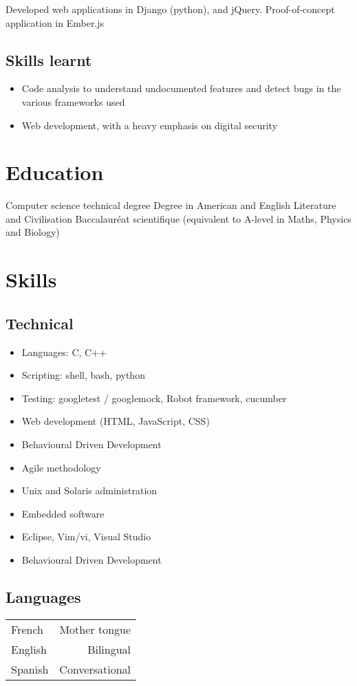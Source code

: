 \documentclass{cv}
\begin{document}
{Developed web applications in Django (python), and jQuery. Proof-of-concept application in Ember.js}
\subsection{Skills learnt}
\begin{itemize}
    \item {Code analysis to understand undocumented features and detect bugs in the various frameworks used}
    \item {Web development, with a heavy emphasis on digital security}
\end{itemize}

\section{Education}
{Computer science technical degree}
{Degree in American and English Literature and Civilisation}
{Baccalauréat scientifique (equivalent to A-level in Maths, Physics and Biology)}
 \section{Skills}

\subsection{Technical}
\begin{itemize}
    \item {Languages: C, C++}
    \item {Scripting: shell, bash, python}
    \item {Testing: googletest / googlemock, Robot framework, cucumber}
    \item {Web development (HTML, JavaScript, CSS)}
    \item {Behavioural Driven Development}
    \item {Agile methodology}
    \item {Unix and Solaris administration}
    \item {Embedded software}
    \item {Eclipse, Vim/vi, Visual Studio}
    \item {Behavioural Driven Development}
\end{itemize}

\subsection{Languages}
\begin{tabular}{L!{\VRule}R}
French&Mother tongue\\
English&Bilingual\\
Spanish&Conversational\\
\end{tabular}
\end{document}
